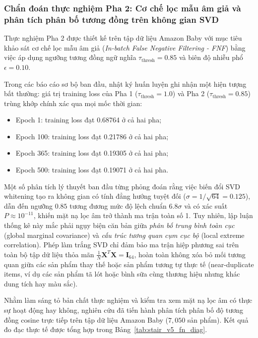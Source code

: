 \subsubsection{Chẩn đoán thực nghiệm Pha 2: Cơ chế lọc mẫu âm giả và phân tích phân bố tương đồng trên không gian SVD}

Thực nghiệm Pha 2 được thiết kế trên tập dữ liệu Amazon Baby với mục tiêu khảo sát cơ chế lọc mẫu âm giả (\textit{In-batch False Negative Filtering - FNF}) bằng việc áp dụng ngưỡng tương đồng ngữ nghĩa $\tau_{\text{thresh}} = 0.85$ và biên độ nhiễu phổ $\epsilon = 0.10$.

Trong các báo cáo sơ bộ ban đầu, nhật ký huấn luyện ghi nhận một hiện tượng bất thường: giá trị training loss của Pha 1 ($\tau_{\text{thresh}} = 1.0$) và Pha 2 ($\tau_{\text{thresh}} = 0.85$) trùng khớp chính xác qua mọi mốc thời gian:
\begin{itemize}
    \item Epoch 1: training loss đạt 0.68764 ở cả hai pha;
    \item Epoch 100: training loss đạt 0.21786 ở cả hai pha;
    \item Epoch 365: training loss đạt 0.19305 ở cả hai pha;
    \item Epoch 500: training loss đạt 0.19071 ở cả hai pha.
\end{itemize}

Một số phân tích lý thuyết ban đầu từng phỏng đoán rằng việc biến đổi SVD whitening tạo ra không gian có tính đẳng hướng tuyệt đối ($\sigma = 1/\sqrt{64} = 0.125$), dẫn đến ngưỡng $0.85$ tương đương mức độ lệch chuẩn $6.8\sigma$ và có xác suất $P \approx 10^{-11}$, khiến mặt nạ lọc âm trở thành ma trận toàn số 1. Tuy nhiên, lập luận thống kê này mắc phải ngụy biện căn bản giữa \textit{phân bố trung bình toàn cục} (global marginal covariance) và \textit{cấu trúc tương quan cụm cục bộ} (local extreme correlation). Phép làm trắng SVD chỉ đảm bảo ma trận hiệp phương sai trên toàn bộ tập dữ liệu thỏa mãn $\frac{1}{N}\mathbf{X}^T\mathbf{X} = \mathbf{I}_{64}$, hoàn toàn không xóa bỏ mối tương quan giữa các sản phẩm thay thế hoặc sản phẩm tương tự thực tế (near-duplicate items, ví dụ các sản phẩm tã lót hoặc bình sữa cùng thương hiệu nhưng khác dung tích hay màu sắc).

Nhằm làm sáng tỏ bản chất thực nghiệm và kiểm tra xem mặt nạ lọc âm có thực sự hoạt động hay không, nghiên cứu đã tiến hành phân tích phân bố độ tương đồng cosine trực tiếp trên tập dữ liệu Amazon Baby ($7{,}050$ sản phẩm). Kết quả đo đạc thực tế được tổng hợp trong Bảng~\ref{tab:stair_v5_fn_diag}.

